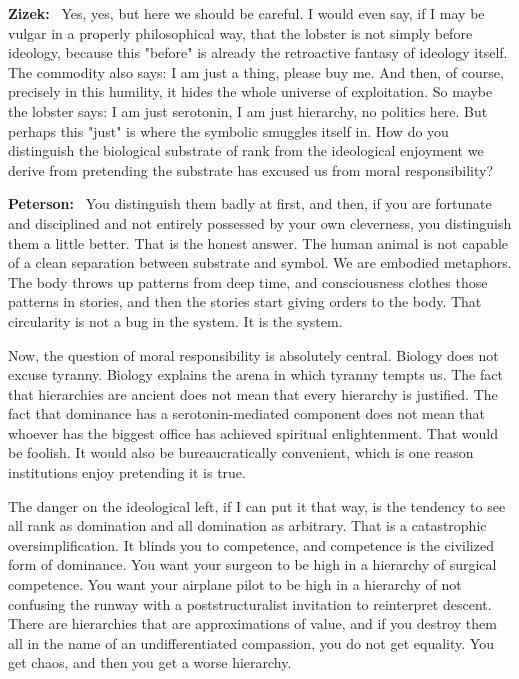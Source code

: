 \documentclass[a4paper,11pt]{article}
\newenvironment{question}{\par\noindent\color{ALIUSRed}\textbf{Zizek:}\ }{\par}
\newenvironment{answer}{\par\noindent\color{black}\textbf{Peterson:}\ }{\par}
\begin{document}
\begin{question}
Yes, yes, but here we should be careful. I would even say, if I may be vulgar in a properly philosophical way, that the lobster is not simply before ideology, because this "before" is already the retroactive fantasy of ideology itself. The commodity also says: I am just a thing, please buy me. And then, of course, precisely in this humility, it hides the whole universe of exploitation. So maybe the lobster says: I am just serotonin, I am just hierarchy, no politics here. But perhaps this "just" is where the symbolic smuggles itself in. How do you distinguish the biological substrate of rank from the ideological enjoyment we derive from pretending the substrate has excused us from moral responsibility?
\end{question}

\begin{answer}
You distinguish them badly at first, and then, if you are fortunate and disciplined and not entirely possessed by your own cleverness, you distinguish them a little better. That is the honest answer. The human animal is not capable of a clean separation between substrate and symbol. We are embodied metaphors. The body throws up patterns from deep time, and consciousness clothes those patterns in stories, and then the stories start giving orders to the body. That circularity is not a bug in the system. It is the system.

Now, the question of moral responsibility is absolutely central. Biology does not excuse tyranny. Biology explains the arena in which tyranny tempts us. The fact that hierarchies are ancient does not mean that every hierarchy is justified. The fact that dominance has a serotonin-mediated component does not mean that whoever has the biggest office has achieved spiritual enlightenment. That would be foolish. It would also be bureaucratically convenient, which is one reason institutions enjoy pretending it is true.

The danger on the ideological left, if I can put it that way, is the tendency to see all rank as domination and all domination as arbitrary. That is a catastrophic oversimplification. It blinds you to competence, and competence is the civilized form of dominance. You want your surgeon to be high in a hierarchy of surgical competence. You want your airplane pilot to be high in a hierarchy of not confusing the runway with a poststructuralist invitation to reinterpret descent. There are hierarchies that are approximations of value, and if you destroy them all in the name of an undifferentiated compassion, you do not get equality. You get chaos, and then you get a worse hierarchy.


\end{answer}
\end{document}
